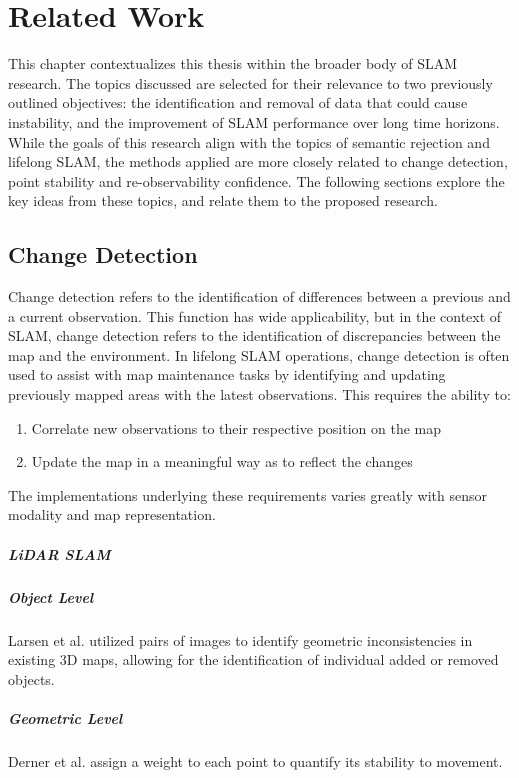 \section{Related Work}
\label{sec:related_work}

This chapter contextualizes this thesis within the broader body of SLAM research. The topics discussed are selected for their relevance to two previously outlined objectives: the identification and removal of data that could cause instability, and the improvement of SLAM performance over long time horizons. While the goals of this research align with the topics of semantic rejection and lifelong SLAM, the methods applied are more closely related to change detection, point stability and re-observability confidence. The following sections explore the key ideas from these topics, and relate them to the proposed research.

\subsection{Change Detection}

Change detection refers to the identification of differences between a previous and a current observation. This function has wide applicability, but in the context of SLAM, change detection refers to the identification of discrepancies between the map and the environment. In lifelong SLAM operations, change detection is often used to assist with map maintenance tasks by identifying and updating previously mapped areas with the latest observations. This requires the ability to:
\begin{enumerate}
    \item Correlate new observations to their respective position on the map
    \item Update the map in a meaningful way as to reflect the changes
\end{enumerate}
The implementations underlying these requirements varies greatly with sensor modality and map representation.

\subparagraph{LiDAR SLAM}



\subparagraph{Object Level}
Larsen et al. \cite{larsenChangeDetectionModel} utilized pairs of images to identify geometric inconsistencies in existing 3D maps, allowing for the identification of individual added or removed objects.

\subparagraph{Geometric Level}
Derner et al. \cite{dernerChangeDetectionUsing2021} assign a weight to each point to quantify its stability to movement.





